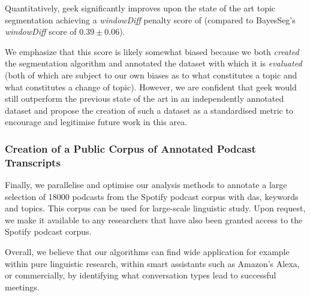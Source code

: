     Quantitatively, \gls{geek} significantly improves upon the state of the art topic segmentation achieving a \textit{windowDiff} penalty score of  (compared to BayesSeg's \textit{windowDiff} score of $0.39 \pm 0.06$). 
    
    We emphasize that this score is likely somewhat biased because we both \textit{created} the segmentation algorithm and annotated the dataset with which it is \textit{evaluated} (both of which are subject to our own biases as to what constitutes a topic and what constitutes a change of topic). However, we are confident that \gls{geek} would still outperform the previous state of the art in an independently annotated dataset and propose the creation of such a dataset as a standardised metric to encourage and legitimise future work in this area.
    

\subsubsection{Creation of a Public Corpus of Annotated Podcast Transcripts}
    Finally, we parallelise and optimise our analysis methods to annotate a large selection of 18000 podcasts from the Spotify podcast corpus\cite{clifton-2020100000} with \glspl{da}, keywords and topics. This corpus can be used for large-scale linguistic study. Upon request, we make it available to any researchers that have also been granted access to the Spotify podcast corpus.
    
    Overall, we believe that our algorithms can find wide application for example within pure linguistic research, within smart assistants such as Amazon's Alexa, or commercially, by identifying what conversation types lead to successful meetings.
    
\glsresetall

\newpage
